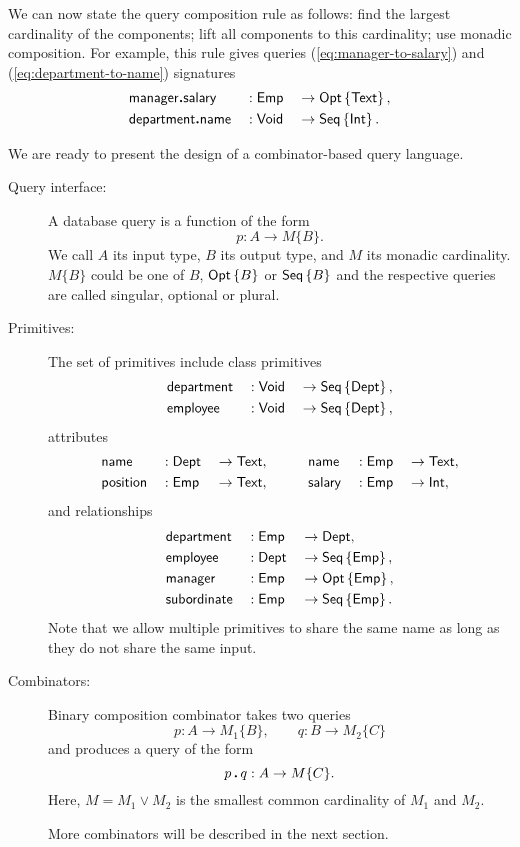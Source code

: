 We can now state the query composition rule as follows: find the largest
cardinality of the components; lift all components to this cardinality; use
monadic composition.  For example, this rule gives queries
(\ref{eq:manager-to-salary}) and (\ref{eq:department-to-name}) signatures
\begin{alignat*}{3}
    & \textup{\textsf{manager}}\boldsymbol{.}\textup{\textsf{salary}} && : \textup{\textsf{Emp}} && \to \textup{\textsf{Opt}}\left\{\textup{\textsf{Text}}\right\}, \\
    & \textup{\textsf{department}}\boldsymbol{.}\textup{\textsf{name}} && : \textup{\textsf{Void}} && \to \textup{\textsf{Seq}}\left\{\textup{\textsf{Int}}\right\}.
\end{alignat*}

We are ready to present the design of a combinator-based query language.

\begin{description}
\item[Query interface:]
A database query is a function of the form
\begin{equation*}
    p : A \to M\{B\}.
\end{equation*}
We call $A$ its input type, $B$ its output type, and $M$ its monadic
cardinality.  $M\{B\}$ could be one of $B$, $\textup{\textsf{Opt}}\left\{B\right\}$ or $\textup{\textsf{Seq}}\left\{B\right\}$ and
the respective queries are called singular, optional or plural.

\item[Primitives:]
The set of primitives include class primitives
\begin{alignat*}{3}
    & \textup{\textsf{department}} && : \textup{\textsf{Void}} && \to \textup{\textsf{Seq}}\left\{\textup{\textsf{Dept}}\right\}, \\
    & \textup{\textsf{employee}} && : \textup{\textsf{Void}} && \to \textup{\textsf{Seq}}\left\{\textup{\textsf{Dept}}\right\},
\end{alignat*}
attributes
\begin{alignat*}{6}
    & \textup{\textsf{name}} && : \textup{\textsf{Dept}} && \to \textup{\textsf{Text}}, \qquad
    && \textup{\textsf{name}} && : \textup{\textsf{Emp}} && \to \textup{\textsf{Text}}, \\
    & \textup{\textsf{position}} && : \textup{\textsf{Emp}} && \to \textup{\textsf{Text}}, \qquad
    && \textup{\textsf{salary}} && : \textup{\textsf{Emp}} && \to \textup{\textsf{Int}},
\end{alignat*}
and relationships
\begin{alignat*}{3}
    & \textup{\textsf{department}} && : \textup{\textsf{Emp}} && \to \textup{\textsf{Dept}}, \\
    & \textup{\textsf{employee}} && : \textup{\textsf{Dept}} && \to \textup{\textsf{Seq}}\left\{\textup{\textsf{Emp}}\right\}, \\
    & \textup{\textsf{manager}} && : \textup{\textsf{Emp}} && \to \textup{\textsf{Opt}}\left\{\textup{\textsf{Emp}}\right\}, \\
    & \textup{\textsf{subordinate}} && : \textup{\textsf{Emp}} && \to \textup{\textsf{Seq}}\left\{\textup{\textsf{Emp}}\right\}.
\end{alignat*}
Note that we allow multiple primitives to share the same name as long as they
do not share the same input.

\item[Combinators:]
Binary composition combinator takes two queries
\begin{equation*}
    p : A \to M_1\{B\}, \qquad
    q : B \to M_2\{C\}
\end{equation*}
and produces a query of the form
\begin{equation*}
    p\,\boldsymbol{.}\,q : A \to M\{C\}.
\end{equation*}
Here, $M = M_1 \lor M_2$ is the smallest common cardinality of $M_1$ and $M_2$.

More combinators will be described in the next section.
\end{description}

